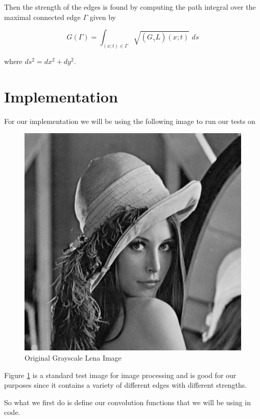 \documentclass{article}
\begin{document}
    Then the strength of the edges is found by computing the path integral over the maximal connected edge $\Gamma$ given by

    \begin{equation}
        G(\Gamma) = \int_{(x;t) \in \Gamma} \sqrt{(G_{\gamma}L)(x;t)} \,\, ds
    \end{equation}

    where $ds^2=dx^2+dy^2$.

\section{Implementation}
    For our implementation we will be using the following image to run our tests on

    \begin{figure}[H]
    \centering
        \includegraphics[scale=0.5]{Images/lena.jpg}
        \caption{Original Grayscale Lena Image}
        \label{lena_o}
    \end{figure}

    Figure \ref{lena_o} is a standard test image for image processing and is good for our purposes since it contains a variety of different edges with different strengths. 

    So what we first do is define our convolution functions that we will be using in code.
\end{document}
